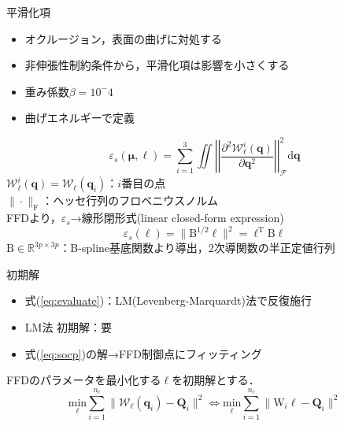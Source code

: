 \documentclass[dvipdfmx]{beamer}
\def\eqref#1{式(\ref{#1})}
\begin{document}
  \begin{frame}{平滑化項}
    \begin{itemize}
        \item オクルージョン，表面の曲げに対処する
        \item 非伸張性制約条件から，平滑化項は影響を小さくする
        \item 重み係数$\beta = 10^-4$
        \item 曲げエネルギーで定義
    \end{itemize}
    \begin{equation}
        \varepsilon_s(\bm{\mu}, \bm{\ell}) = \sum_{i=1}^3 \iint \left|\left| \frac{\partial^2\mathcal{W}_{\bm{\ell}}^i(\mathrm{\bm{q}})}{\partial\mathrm{\bm{q}}^2} \right|\right|_{\mathcal{F}}^2 \mathrm{d \bm{q}}
    \end{equation}
    $\mathcal{W}_{\bm{\ell}}^i(\mathrm{\bm{q}}) = \mathcal{W}_{\bm{\ell}}(\mathrm{\bm{q}}_i)$：$i$番目の点 \\
    $\|\cdot\|_\mathrm{F}$：ヘッセ行列のフロベニウスノルム \\
    FFDより，$\varepsilon_s$→線形閉形式(linear closed-form expression)
    \begin{equation}
        \varepsilon_s(\bm{\ell}) = \|\mathrm{B}^{1/2}\bm{\ell}\|^2 = \bm{\ell}^{\mathrm{T}}\mathrm{B}\bm{\ell}
    \end{equation}
    $\mathrm{B} \in \mathbb{R}^{3p\times3p}$：B-spline基底関数より導出，2次導関数の半正定値行列
  \end{frame}
  \begin{frame}{初期解}
    \begin{itemize}
        \item \eqref{eq:evaluate}：LM(Levenberg-Marquardt)法で反復施行
        \item LM法  初期解：要
        \item \eqref{eq:socp}の解→FFD制御点にフィッティング
    \end{itemize} 
    FFDのパラメータを最小化する$\bm{\ell}$を初期解とする．
    \begin{equation}
        \underset{\bm{\ell}} {\text{min}} {\sum_{i=1}^{n_c}\|\mathcal{W}_{\bm{\ell}}(\mathrm{\bm{q}}_i)-\bm{Q}_i\|^2} \iff \underset{\bm{\ell}} {\text{min}} {\sum_{i=1}^{n_c}\|\mathrm{W}_i\bm{\ell}-\bm{Q}_i\|^2}
    \end{equation}
  \end{frame}
\end{document}
